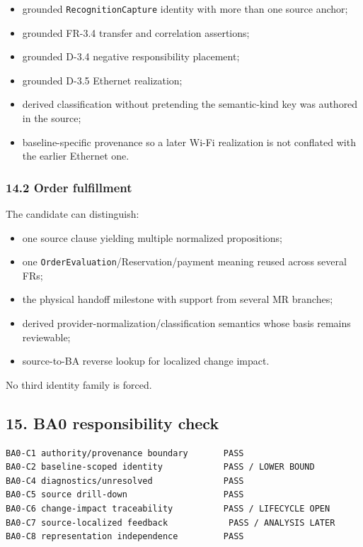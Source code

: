 \documentclass[11pt,a4paper]{article}
\providecommand{\tightlist}{\setlength{\itemsep}{0pt}\setlength{\parskip}{0pt}}
\begin{document}
\begin{itemize}
\tightlist
\item
  grounded \texttt{RecognitionCapture} identity with more than one source anchor;
\item
  grounded FR-3.4 transfer and correlation assertions;
\item
  grounded D-3.4 negative responsibility placement;
\item
  grounded D-3.5 Ethernet realization;
\item
  derived classification without pretending the semantic-kind key was authored in the source;
\item
  baseline-specific provenance so a later Wi-Fi realization is not conflated with the earlier Ethernet one.
\end{itemize}

\subsubsection{14.2 Order fulfillment}\label{142-order-fulfillment}

The candidate can distinguish:

\begin{itemize}
\tightlist
\item
  one source clause yielding multiple normalized propositions;
\item
  one \texttt{OrderEvaluation}/Reservation/payment meaning reused across several FRs;
\item
  the physical handoff milestone with support from several MR branches;
\item
  derived provider-normalization/classification semantics whose basis remains reviewable;
\item
  source-to-BA reverse lookup for localized change impact.
\end{itemize}

No third identity family is forced.

\subsection{15. BA0 responsibility check}\label{15-ba0-responsibility-check}

\begin{verbatim}
BA0-C1 authority/provenance boundary       PASS
BA0-C2 baseline-scoped identity            PASS / LOWER BOUND
BA0-C4 diagnostics/unresolved              PASS
BA0-C5 source drill-down                   PASS
BA0-C6 change-impact traceability          PASS / LIFECYCLE OPEN
BA0-C7 source-localized feedback            PASS / ANALYSIS LATER
BA0-C8 representation independence         PASS
\end{verbatim}
\end{document}
